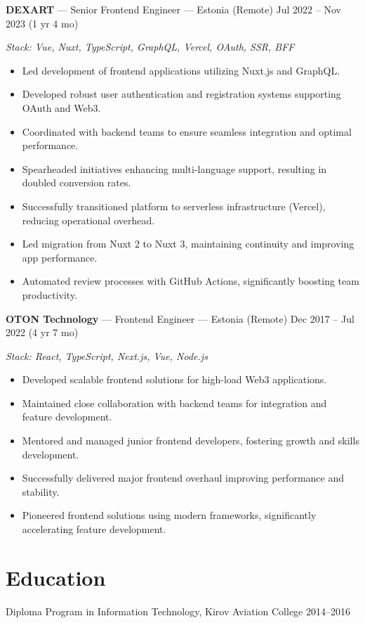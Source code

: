 \documentclass[a4paper,9pt]{article}
\begin{document}
\textbf{DEXART} --- Senior Frontend Engineer --- Estonia (Remote) \hfill Jul 2022 -- Nov 2023 (1 yr 4 mo)

\textit{Stack: Vue, Nuxt, TypeScript, GraphQL, Vercel, OAuth, SSR, BFF}
\begin{itemize}[leftmargin=*]
  \item Led development of frontend applications utilizing Nuxt.js and GraphQL.
  \item Developed robust user authentication and registration systems supporting OAuth and Web3.
  \item Coordinated with backend teams to ensure seamless integration and optimal performance.
  \item Spearheaded initiatives enhancing multi-language support, resulting in doubled conversion rates.
  \item Successfully transitioned platform to serverless infrastructure (Vercel), reducing operational overhead.
  \item Led migration from Nuxt 2 to Nuxt 3, maintaining continuity and improving app performance.
  \item Automated review processes with GitHub Actions, significantly boosting team productivity.
\end{itemize}
\vspace{6pt}

\textbf{OTON Technology} --- Frontend Engineer --- Estonia (Remote) \hfill Dec 2017 -- Jul 2022 (4 yr 7 mo)

\textit{Stack: React, TypeScript, Next.js, Vue, Node.js}
\begin{itemize}[leftmargin=*]
  \item Developed scalable frontend solutions for high-load Web3 applications.
  \item Maintained close collaboration with backend teams for integration and feature development.
  \item Mentored and managed junior frontend developers, fostering growth and skills development.
  \item Successfully delivered major frontend overhaul improving performance and stability.
  \item Pioneered frontend solutions using modern frameworks, significantly accelerating feature development.
\end{itemize}

\section{Education}
Diploma Program in Information Technology, Kirov Aviation College \hfill 2014--2016
\end{document}
